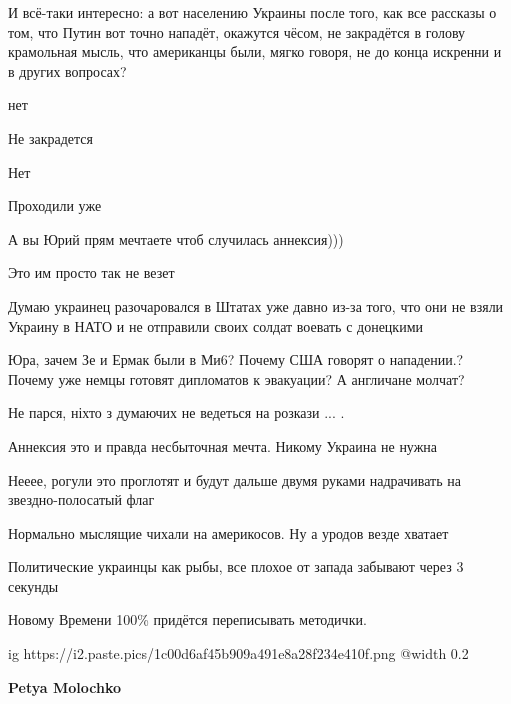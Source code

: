 \raggedcolumns
\begin{multicols}{2} %
\setlength{\parindent}{0pt}

И всё-таки интересно: а вот населению Украины после того, как все рассказы о
том, что Путин вот точно нападёт, окажутся чёсом, не закрадётся в голову
крамольная мысль, что американцы были, мягко говоря, не до конца искренни и в
других вопросах?

нет

Не закрадется

Нет

Проходили уже

А вы Юрий прям мечтаете чтоб случилась аннексия)))

Это им просто так не везет


Думаю украинец разочаровался в Штатах уже давно из-за того, что они не взяли
Украину в НАТО и не отправили своих солдат воевать с донецкими


Юра, зачем Зе и Ермак были в Ми6? Почему США говорят о нападении.? Почему уже
немцы готовят дипломатов к эвакуации? А англичане молчат?


Не парся, ніхто з думаючих не ведеться на розкази ... .


Аннексия это и правда несбыточная мечта. Никому Украина не нужна


Нееее, рогули это проглотят и будут дальше двумя руками надрачивать на звездно-полосатый флаг


Нормально мыслящие чихали на  америкосов. Ну а уродов везде хватает


Политические украинцы как рыбы, все плохое от запада забывают через 3 секунды


Новому Времени 100\% придётся переписывать методички.

\ifcmt
  ig https://i2.paste.pics/1c00d6af45b909a491e8a28f234e410f.png
  @width 0.2
\fi

\textbf{Petya Molochko}


\end{multicols}
